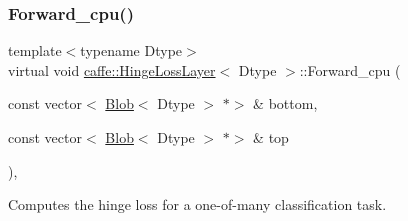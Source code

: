 \subsubsection{\texorpdfstring{Forward\+\_\+cpu()}{Forward\_cpu()}\hspace{0.1cm}{\footnotesize\ttfamily [1/2]}}
{\footnotesize\ttfamily template$<$typename Dtype$>$ \\
virtual void \mbox{\hyperlink{classcaffe_1_1_hinge_loss_layer}{caffe\+::\+Hinge\+Loss\+Layer}}$<$ Dtype $>$\+::Forward\+\_\+cpu (\begin{DoxyParamCaption}\item[{const vector$<$ \mbox{\hyperlink{classcaffe_1_1_blob}{Blob}}$<$ Dtype $>$ $\ast$$>$ \&}]{bottom,  }\item[{const vector$<$ \mbox{\hyperlink{classcaffe_1_1_blob}{Blob}}$<$ Dtype $>$ $\ast$$>$ \&}]{top }\end{DoxyParamCaption})\hspace{0.3cm}{\ttfamily [protected]}, {\ttfamily [virtual]}}



Computes the hinge loss for a one-\/of-\/many classification task. 


